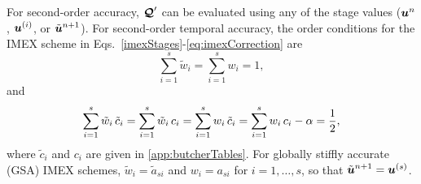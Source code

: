 For second-order accuracy, $\boldsymbol{\mathcal{Q}}'$ can be evaluated using any of the stage values ($\boldsymbol{u}^{n}$, $\boldsymbol{u}^{(i)}$, or $\tilde{\boldsymbol{u}}^{n+1}$).  
For second-order temporal accuracy, the order conditions for the IMEX scheme in Eqs.~\eqref{imexStages}-\eqref{eq:imexCorrection} are
\begin{equation}
  \sum_{i=1}^{s}\tilde{w}_{i}=\sum_{i=1}^{s}w_{i}=1,
  \label{orderConditions1}
\end{equation}
and
\begin{equation}
  \sum_{i=1}^{s}\tilde{w}_{i}\,\tilde{c}_{i}
  =\sum_{i=1}^{s}\tilde{w}_{i}\,c_{i}
  =\sum_{i=1}^{s}w_{i}\,\tilde{c}_{i}
  =\sum_{i=1}^{s}w_{i}\,c_{i}-\alpha=\frac{1}{2}, 
  \label{orderConditions2}
\end{equation}
where $\tilde{c}_{i}$ and $c_{i}$ are given in \ref{app:butcherTables}.  
For globally stiffly accurate (GSA) IMEX schemes, $\tilde{w}_{i}=\tilde{a}_{si}$ and $w_{i}=a_{si}$ for $i=1,\ldots,s$, so that $\tilde{\boldsymbol{u}}^{n+1}=\boldsymbol{u}^{(s)}$.  

